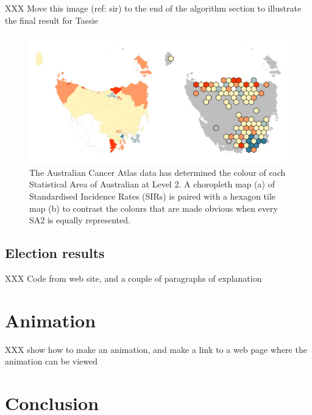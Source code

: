 \documentclass[
]{jss}
\begin{document}
XXX Move this image (ref: sir) to the end of the algorithm section to
illustrate the final result for Tassie

\begin{CodeChunk}
\begin{figure}

{\centering \includegraphics[width=1\linewidth]{figures/7SIR} 

}

\caption[The Australian Cancer Atlas data has determined the colour of each Statistical Area of Australian at Level 2]{The Australian Cancer Atlas data has determined the colour of each Statistical Area of Australian at Level 2. A choropleth map (a) of Standardised Incidence Rates (SIRs) is paired with a hexagon tile map (b) to contrast the colours that are made obvious when every SA2 is equally represented.}\label{fig:sir}
\end{figure}
\end{CodeChunk}

\hypertarget{election-results}{%
\subsection{Election results}\label{election-results}}

XXX Code from web site, and a couple of paragraphs of explanation

\hypertarget{animation}{%
\section{Animation}\label{animation}}

XXX show how to make an animation, and make a link to a web page where
the animation can be viewed

\hypertarget{conclusion}{%
\section{Conclusion}\label{conclusion}}
\end{document}
